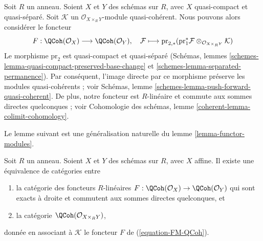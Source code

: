 \begin{example}
\label{example-functor-quasi-coherent}
Soit $R$ un anneau. Soient $X$ et $Y$ des
schémas sur $R$, avec $X$ quasi-compact et quasi-séparé.
Soit $\mathcal{K}$ un $\mathcal{O}_{X \times_R Y}$-module quasi-cohérent.
Nous pouvons alors considérer le foncteur
\begin{equation}
\label{equation-FM-QCoh}
F : \QCoh(\mathcal{O}_X) \longrightarrow \QCoh(\mathcal{O}_Y),\quad
\mathcal{F} \longmapsto
\text{pr}_{2, *}(\text{pr}_1^*\mathcal{F}
\otimes_{\mathcal{O}_{X \times_R Y}} \mathcal{K})
\end{equation}
Le morphisme $\text{pr}_2$ est quasi-compact et quasi-séparé
(Schémas, lemmes \ref{schemes-lemma-quasi-compact-preserved-base-change}
et \ref{schemes-lemma-separated-permanence}). Par conséquent, l'image directe par
ce morphisme préserve les modules quasi-cohérents ; voir
Schémas, lemme \ref{schemes-lemma-push-forward-quasi-coherent}.
De plus, notre foncteur est $R$-linéaire et commute aux sommes directes quelconques ;
voir Cohomologie des schémas, lemme \ref{coherent-lemma-colimit-cohomology}.
\end{example}

\noindent
Le lemme suivant est une généralisation naturelle du
lemme \ref{lemma-functor-modules}.

\begin{lemma}
\label{lemma-functor-quasi-coherent-from-affine}
Soit $R$ un anneau. Soient $X$ et $Y$ des schémas sur $R$, avec $X$ affine.
Il existe une équivalence de catégories entre
\begin{enumerate}
\item la catégorie des foncteurs $R$-linéaires
$F : \QCoh(\mathcal{O}_X) \to \QCoh(\mathcal{O}_Y)$
qui sont exacts à droite et commutent aux sommes directes quelconques, et
\item la catégorie $\QCoh(\mathcal{O}_{X \times_R Y})$,
\end{enumerate}
donnée en associant à $\mathcal{K}$ le foncteur $F$ de (\ref{equation-FM-QCoh}).
\end{lemma}

